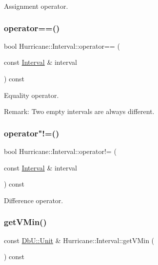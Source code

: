Assignment operator. \mbox{\label{classHurricane_1_1Interval_ad10b5fbbeb4531915a6031353e148edc}} 
\subsubsection{\texorpdfstring{operator==()}{operator==()}}
{\footnotesize\ttfamily bool Hurricane\+::\+Interval\+::operator== (\begin{DoxyParamCaption}\item[{const \hyperlink{classHurricane_1_1Interval}{Interval} \&}]{interval }\end{DoxyParamCaption}) const}

Equality operator.

\begin{DoxyParagraph}{Remark\+:}
Two empty intervals are always different. 
\end{DoxyParagraph}
\mbox{\label{classHurricane_1_1Interval_a2703ebb1e70d93d96ae8e29748c53d14}} 
\subsubsection{\texorpdfstring{operator"!=()}{operator!=()}}
{\footnotesize\ttfamily bool Hurricane\+::\+Interval\+::operator!= (\begin{DoxyParamCaption}\item[{const \hyperlink{classHurricane_1_1Interval}{Interval} \&}]{interval }\end{DoxyParamCaption}) const}

Difference operator. \mbox{\label{classHurricane_1_1Interval_a6e0deb1b38065375a78c7fd6885b5909}} 
\subsubsection{\texorpdfstring{get\+V\+Min()}{getVMin()}}
{\footnotesize\ttfamily const \hyperlink{group__DbUGroup_ga4fbfa3e8c89347af76c9628ea06c4146}{Db\+U\+::\+Unit} \& Hurricane\+::\+Interval\+::get\+V\+Min (\begin{DoxyParamCaption}{ }\end{DoxyParamCaption}) const\hspace{0.3cm}{\ttfamily [inline]}}

